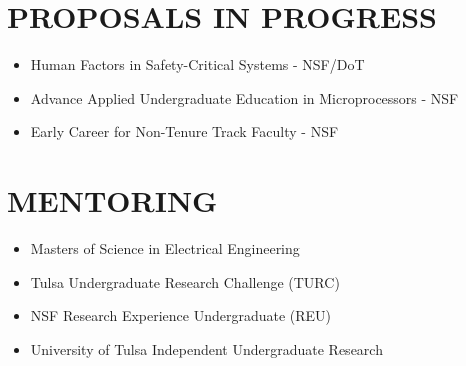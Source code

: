 \documentclass[line]{res} %
\begin{document}
\begin{resume}
\begin{center}
\begin{itemize}
\end{itemize}
\end{center}

\vspace{0.2in} %

\section{PROPOSALS IN PROGRESS} 

\vspace{8pt} %

\begin{itemize}
\item Human Factors in Safety-Critical Systems - NSF/DoT
\item Advance Applied Undergraduate Education in Microprocessors - NSF
\item Early Career for Non-Tenure Track Faculty - NSF
\end{itemize}

\vspace{0.2in} %

\section{MENTORING} 
\vspace{8pt} %

\begin{itemize}
\item Masters of Science in Electrical Engineering
\item Tulsa Undergraduate Research Challenge (TURC)
\item NSF Research Experience Undergraduate (REU)
\item University of Tulsa Independent Undergraduate Research
\end{itemize}

\vspace{0.2in} %


\end{resume}
\end{document}
